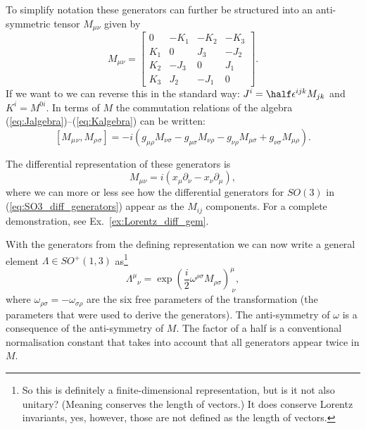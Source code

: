 \documentclass[notes.tex]{subfiles}
\begin{document}
To simplify notation these generators can further be structured into an anti-symmetric tensor $M_{\mu\nu}$ given by
\begin{equation}
M_{\mu\nu} = \begin{bmatrix}0 & -K_1 & -K_2 & -K_3\\ K_1 & 0 & J_3 & -J_2\\ K_2 & -J_3 & 0 & J_1 \\ K_3 & J_2 & - J_1 & 0\end{bmatrix}.
\label{eq:M}
\end{equation}
If we want to we can reverse this in the standard way: $J^i=\half \epsilon^{ijk} M_{jk}$ and $K^i=M^{0i}$.
In terms of $M$ the commutation relations of the algebra (\ref{eq:Jalgebra})--(\ref{eq:Kalgebra})  can be written:
\begin{equation}\label{eq:poco1}
[M_\mu{}_\nu, M_\rho{}_\sigma] = -i(g_{\mu\rho}M_{\nu\sigma} - g_{\mu\sigma}M_{\nu\rho} - g_{\nu\rho}M_{\mu\sigma} + g_{\nu\sigma}M_{\mu\rho}).
\end{equation}

The differential representation of these generators is
\begin{equation}
M_{\mu\nu}=i(x_\mu\partial_\nu-x_\nu\partial_\mu),
\label{eq:Lorentz_diff_gen}
\end{equation}
where we can more or less  see how the differential generators for $SO(3)$ in (\ref{eq:SO3_diff_generators}) appear as the $M_{ij}$ components. For a complete demonstration, see Ex.~\ref{ex:Lorentz_diff_gem}.

With the generators from the defining representation we can now write a general element $\Lambda \in SO^+(1,3)$ as\footnote{So this is definitely a finite-dimensional representation, but is it not also unitary? (Meaning conserves the length of vectors.) It does conserve Lorentz invariants, yes, however, those are not defined as the length of vectors.}
\begin{equation}
\Lambda^\mu{}_\nu = \exp\left(\frac{i}{2}\omega^{\rho \sigma}M_{\rho \sigma}\right)^\mu_{~\nu},
\label{eq:exp_map_Lorentz}
\end{equation}
where $\omega_{\rho\sigma} = -\omega_{\sigma \rho}$ are the six free parameters of the transformation (the parameters that were used to derive the generators). The anti-symmetry of $\omega$ is a consequence of the anti-symmetry of $M$. The factor of a half is a conventional normalisation constant that takes into account that all generators appear twice in $M$. 
\end{document}
